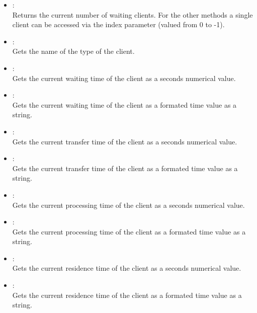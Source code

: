\begin{itemize}

\item
{}:\\
Returns the current number of waiting clients. For the other
methods a single client can be accessed via the index parameter
(valued from 0 to -1).

\item
{}:\\
Gets the name of the type of the client.

\item
{}:\\
Gets the current waiting time of the client as a seconds numerical value.

\item
{}:\\
Gets the current waiting time of the client as a formated time value as a string.

\item
{}:\\
Gets the current transfer time of the client as a seconds numerical value.

\item
{}:\\
Gets the current transfer time of the client as a formated time value as a string.

\item
{}:\\
Gets the current processing time of the client as a seconds numerical value.

\item
{}:\\
Gets the current processing time of the client as a formated time value as a string.

\item
{}:\\
Gets the current residence time of the client as a seconds numerical value.

\item
{}:\\
Gets the current residence time of the client as a formated time value as a string.


\end{itemize}

